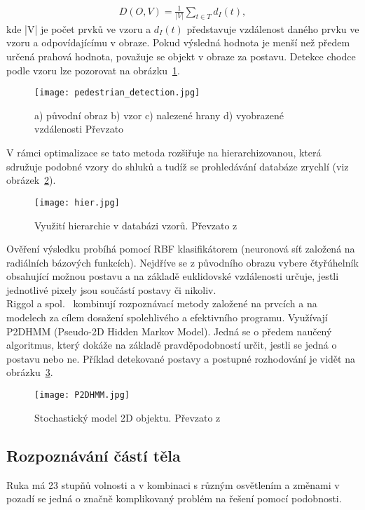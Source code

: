 \begin{eqnarray}
 D(O,V) = \frac{1}{|V|}\sum_{t\in T}^{}d_{I}(t) ,
\end{eqnarray}
kde |V| je počet prvků ve vzoru a $ d_{I}(t) $ představuje vzdálenost daného prvku ve vzoru a odpovídajícímu v obraze. Pokud výsledná hodnota je menší než předem určená prahová hodnota, považuje se objekt v obraze za postavu. Detekce chodce podle vzoru lze pozorovat na obrázku~\ref{pic3}. \\
\begin{figure}[h]
\centering
\texttt{[image: pedestrian\_detection.jpg]}
\caption{a) původní obraz b) vzor c) nalezené hrany d) vyobrazené vzdálenosti
Převzato ~\cite{7} }
\label{pic3}
\end{figure}
\newpage 
V rámci optimalizace se tato metoda rozšiřuje na hierarchizovanou, která sdružuje podobné vzory do shluků a tudíž se prohledávání databáze zrychlí (viz obrázek~\ref{pic4}).
\begin{figure}[h]
\centering
\texttt{[image: hier.jpg]}
\caption{Využití hierarchie v databázi vzorů. Převzato z ~\cite{7} }
\label{pic4}
\end{figure}

Ověření výsledku probíhá pomocí RBF klasifikátorem (neuronová síť založená na radiálních bázových funkcích). Nejdříve se z původního obrazu vybere čtyřúhelník obsahující možnou postavu a na základě euklidovské vzdálenosti určuje, jestli jednotlivé pixely jsou součástí postavy či nikoliv.\\

Riggol a spol.~\cite{11} kombinují rozpoznávací metody založené na prvcích a na modelech za cílem dosažení spolehlivého a efektivního programu. Využívají P2DHMM (Pseudo-2D Hidden Markov Model). Jedná se o předem naučený algoritmus, který dokáže na základě pravděpodobností určit, jestli se jedná o postavu nebo ne. Příklad detekované postavy a postupné rozhodování je vidět na obrázku~\ref{pic5}.\\
\begin{figure}[h]
\centering
\texttt{[image: P2DHMM.jpg]}
\caption{Stochastický model 2D objektu. Převzato z ~\cite{11} } %
\label{pic5}
\end{figure}


\subsection{Rozpoznávání částí těla}
Ruka má 23 stupňů volnosti a v kombinaci s různým osvětlením a změnami v pozadí se jedná o značně komplikovaný problém na řešení pomocí podobnosti.\\


